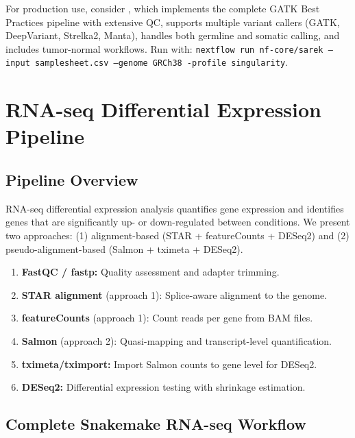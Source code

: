 \begin{tipbox}[title={Production Alternative: nf-core/sarek}]
For production use, consider , which implements the complete GATK Best Practices pipeline with extensive QC, supports multiple variant callers (GATK, DeepVariant, Strelka2, Manta), handles both germline and somatic calling, and includes tumor-normal workflows. Run with: \texttt{nextflow run nf-core/sarek --input samplesheet.csv --genome GRCh38 -profile singularity}.
\end{tipbox}

\section{RNA-seq Differential Expression Pipeline}
\label{sec:wf:rnaseq}

\subsection{Pipeline Overview}

RNA-seq differential expression analysis quantifies gene expression and identifies genes that are significantly up- or down-regulated between conditions. We present two approaches: (1) alignment-based (STAR + featureCounts + DESeq2) and (2) pseudo-alignment-based (Salmon + tximeta + DESeq2).

\begin{enumerate}[itemsep=2pt]
  \item \textbf{FastQC / fastp:} Quality assessment and adapter trimming.
  \item \textbf{STAR alignment} (approach 1): Splice-aware alignment to the genome.
  \item \textbf{featureCounts} (approach 1): Count reads per gene from BAM files.
  \item \textbf{Salmon} (approach 2): Quasi-mapping and transcript-level quantification.
  \item \textbf{tximeta/tximport:} Import Salmon counts to gene level for DESeq2.
  \item \textbf{DESeq2:} Differential expression testing with shrinkage estimation.
\end{enumerate}

\subsection{Complete Snakemake RNA-seq Workflow}


